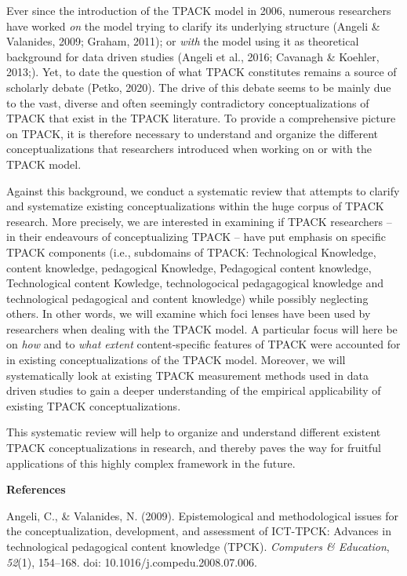 \documentclass[
]{article}
\begin{document}
Ever since the introduction of the TPACK model in 2006, numerous
researchers have worked \emph{on} the model trying to clarify its
underlying structure (Angeli \& Valanides, 2009; Graham, 2011); or
\emph{with} the model using it as theoretical background for data driven
studies (Angeli et al., 2016; Cavanagh \& Koehler, 2013;). Yet, to date
the question of what TPACK constitutes remains a source of scholarly
debate (Petko, 2020). The drive of this debate seems to be mainly due to
the vast, diverse and often seemingly contradictory conceptualizations
of TPACK that exist in the TPACK literature. To provide a comprehensive
picture on TPACK, it is therefore necessary to understand and organize
the different conceptualizations that researchers introduced when
working on or with the TPACK model.

Against this background, we conduct a systematic review that attempts to
clarify and systematize existing conceptualizations within the huge
corpus of TPACK research. More precisely, we are interested in examining
if TPACK researchers -- in their endeavours of conceptualizing TPACK --
have put emphasis on specific TPACK components (i.e., subdomains of
TPACK: Technological Knowledge, content knowledge, pedagogical
Knowledge, Pedagogical content knowledge, Technological content
Kowledge, technologocical pedagagogical knowledge and technological
pedagogical and content knowledge) while possibly neglecting others. In
other words, we will examine which foci lenses have been used by
researchers when dealing with the TPACK model. A particular focus will
here be on \emph{how} and to \emph{what extent} content-specific
features of TPACK were accounted for in existing conceptualizations of
the TPACK model. Moreover, we will systematically look at existing TPACK
measurement methods used in data driven studies to gain a deeper
understanding of the empirical applicability of existing TPACK
conceptualizations.

This systematic review will help to organize and understand different
existent TPACK conceptualizations in research, and thereby paves the way
for fruitful applications of this highly complex framework in the
future.

\textbf{References}

Angeli, C., \& Valanides, N. (2009). Epistemological and methodological
issues for the conceptualization, development, and assessment of
ICT-TPCK: Advances in technological pedagogical content knowledge
(TPCK). \emph{Computers \& Education}, \emph{52}(1), 154--168. doi:
10.1016/j.compedu.2008.07.006.
\end{document}

